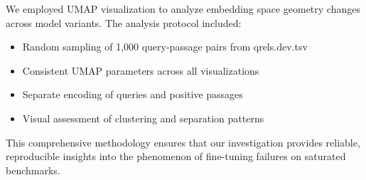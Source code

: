 We employed UMAP visualization to analyze embedding space geometry changes across model variants. The analysis protocol included:

\begin{itemize}
\item Random sampling of 1,000 query-passage pairs from qrels.dev.tsv
\item Consistent UMAP parameters across all visualizations
\item Separate encoding of queries and positive passages
\item Visual assessment of clustering and separation patterns
\end{itemize}

This comprehensive methodology ensures that our investigation provides reliable, reproducible insights into the phenomenon of fine-tuning failures on saturated benchmarks.

